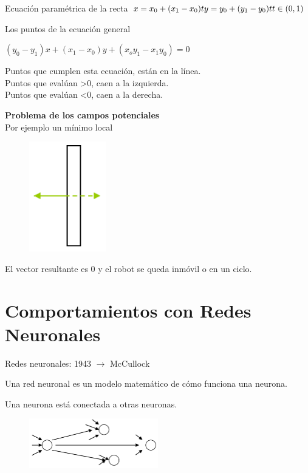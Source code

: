 Ecuación paramétrica de la recta
$
x = x_0 + (x_1 - x_0)t \\
y = y_0 + (y_1 - y_0)t \\
t \in (0,1)
$

Los puntos de la ecuación general

$
(y_0 - y_1)x + (x_1 - x_0)y + (x_oy_1 - x_1y_0) = 0
$

Puntos que cumplen esta ecuación, están en la línea.
\\ Puntos que evalúan >0, caen a la izquierda. \\ Puntos que evalúan <0, caen a la derecha.

\textbf{Problema de los campos potenciales}
\\ Por ejemplo un mínimo local


\begin{figure}[h!]
	\centering
	\includegraphics[width=0.3\textwidth]{images/img71.png}
	\label{figura71}
\end{figure}


El vector resultante es 0 y el robot se queda inmóvil o en un ciclo.

\section{Comportamientos con Redes Neuronales}

Redes neuronales: 1943 $\rightarrow$  McCullock


Una red neuronal es un modelo matemático de cómo funciona una neurona.

Una neurona está conectada a otras neuronas.

\begin{figure}[h!]
	\centering
	\includegraphics[width=0.5\textwidth]{images/img72.png}
	\label{figura72}
\end{figure}

